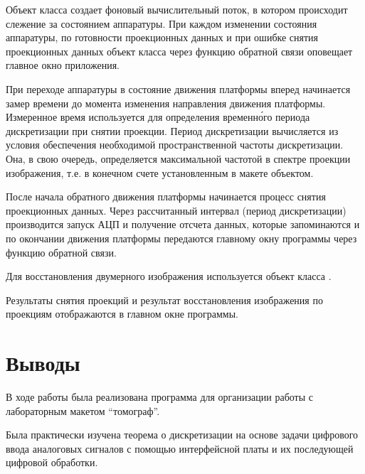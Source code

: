 Объект класса  создает фоновый вычислительный поток, в котором происходит слежение за состоянием аппаратуры. При каждом изменении состояния аппаратуры, по готовности проекционных данных и при ошибке снятия проекционных данных объект класса через функцию обратной связи оповещает главное окно приложения.

При переходе аппаратуры в состояние движения платформы вперед начинается замер времени до момента изменения направления движения платформы. Измеренное время используется для определения временн\'{о}го периода дискретизации при снятии проекции. Период дискретизации вычисляется из условия обеспечения необходимой пространственной частоты дискретизации. Она, в свою очередь, определяется максимальной частотой в спектре проекции изображения, т.е. в конечном счете установленным в макете объектом.

После начала обратного движения платформы начинается процесс снятия проекционных данных. Через рассчитанный интервал (период дискретизации) производится запуск АЦП и получение отсчета данных, которые запоминаются и по окончании движения платформы передаются главному окну программы через функцию обратной связи.

Для восстановления двумерного изображения используется объект класса .

Результаты снятия проекций и результат восстановления изображения по проекциям отображаются в главном окне программы.

\section{Выводы}

В ходе работы была реализована программа для организации работы с лабораторным макетом \enquote{томограф}.

Была практически изучена теорема о дискретизации на основе задачи цифрового ввода аналоговых сигналов с помощью интерфейсной платы и их последующей цифровой обработки.